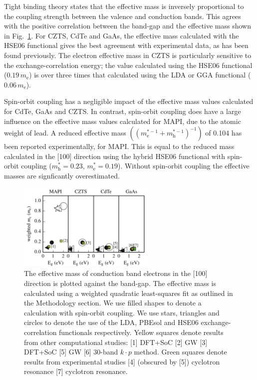 Tight binding theory states that the effective mass is inversely proportional to the coupling strength between the valence and conduction bands.\autocite{Kittel2005} 
This agrees with the positive correlation between the band-gap and the effective mass shown in Fig.\ \ref{m*_bandgap_plot}.
For CZTS, CdTe and GaAs, the effective mass calculated with the HSE06 functional gives the best agreement with experimental data, as has been found previously.\autocite{Kim2010} 
The electron effective mass in CZTS is particularly sensitive to the exchange-correlation energy; the value calculated using the HSE06 functional ($0.19\,m_{\text{e}}$) is over three times that calculated using the LDA or GGA functional ($0.06\,m_\text{e}$).

Spin-orbit coupling has a negligible impact of the effective mass values calculated for CdTe, GaAs and CZTS.
In contrast, spin-orbit coupling does have a large influence on the effective mass values calculated for MAPI, due to the atomic weight of lead. 
A reduced effective mass $((m^{*-1}_{\text{e}}+m^{*-1}_{\text{h}})^{-1})$ of 0.104 has been reported experimentally,\autocite{Miyata2015} for MAPI.
This is equal to the reduced mass calculated in the [100] direction using the hybrid HSE06 functional with spin-orbit coupling ($m^*_{\text{h}}=0.23$, $m^*_{\text{e}}=0.19$). 
Without spin-orbit coupling the effective masses are signficantly overestimated. 

\begin{figure}[tb] \centering
\includegraphics[width=0.6\textwidth]{./figures/ch4/m__bandgap_plot.pdf}
\caption[Plot of effective mass against band-gap at various levels of theory]{\label{m*_bandgap_plot}The effective mass of conduction band electrons in the [100] direction is plotted against the band-gap. The effective mass is calculated using a weighted quadratic least-squares fit as outlined in the Methodology section. We use filled shapes to denote a calculation with spin-orbit coupling. We use stars, triangles and circles to denote the use of the LDA, PBEsol and HSE06 exchange-correlation functionals respectively. Yellow squares denote results from other computational studies: [1] DFT+SoC\autocite{Filip2015} [2] GW\autocite{Filip2015} [3] DFT+SoC\autocite{Liu2012} [5] GW\autocite{Deguchi2016}  [6] 30-band $k\cdot p$ method.\autocite{Richard2004} Green squares denote results from experimental studies [4] (obscured by [5]) cyclotron resonance\autocite{Madelung2004} [7] cyclotron resonance.\autocite{Madelung2004}}
\end{figure}

